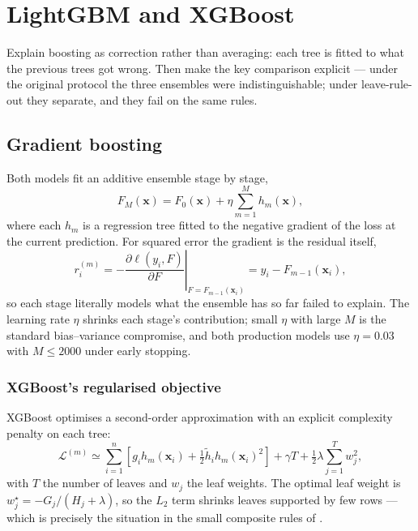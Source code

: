 \chapter{LightGBM and XGBoost}
\label{ch:lgbm-xgb}

\begin{saybox}[title=What to say at the start of this section]
Explain boosting as correction rather than averaging: each tree is fitted
to what the previous trees got wrong. Then make the key comparison
explicit --- under the original protocol the three ensembles were
indistinguishable; under leave-rule-out they separate, and they fail on
the same rules.
\end{saybox}

\section{Gradient boosting}

Both models fit an additive ensemble stage by stage,
\begin{equation}
F_M(\mathbf{x}) = F_0(\mathbf{x}) + \eta \sum_{m=1}^{M} h_m(\mathbf{x}),
\end{equation}
where each $h_m$ is a regression tree fitted to the negative gradient of
the loss at the current prediction. For squared error the gradient is the
residual itself,
\begin{equation}
r_i^{(m)} = -\left. \frac{\partial \ell(y_i, F)}{\partial F} \right|_{F = F_{m-1}(\mathbf{x}_i)}
= y_i - F_{m-1}(\mathbf{x}_i),
\end{equation}
so each stage literally models what the ensemble has so far failed to
explain. The learning rate $\eta$ shrinks each stage's contribution;
small $\eta$ with large $M$ is the standard bias--variance compromise, and
both production models use $\eta = 0.03$ with $M \le 2000$ under early
stopping.

\subsection{XGBoost's regularised objective}

XGBoost optimises a second-order approximation with an explicit complexity
penalty on each tree:
\begin{equation}
\mathcal{L}^{(m)} \simeq \sum_{i=1}^{n}
\left[ g_i h_m(\mathbf{x}_i) + \tfrac{1}{2} \tilde{h}_i h_m(\mathbf{x}_i)^2 \right]
+ \gamma T + \tfrac{1}{2}\lambda \sum_{j=1}^{T} w_j^2 ,
\end{equation}
with $T$ the number of leaves and $w_j$ the leaf weights. The optimal leaf
weight is $w_j^\star = -G_j / (H_j + \lambda)$, so the $L_2$ term shrinks
leaves supported by few rows --- which is precisely the situation in the
small composite rules of .

